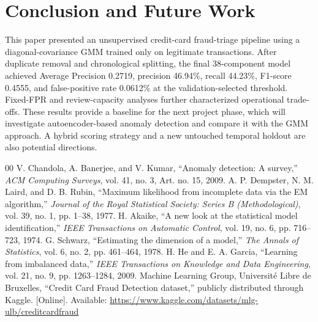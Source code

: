 \documentclass[conference]{IEEEtran}
\begin{document}
\section{Conclusion and Future Work}
This paper presented an unsupervised credit-card fraud-triage pipeline using a diagonal-covariance GMM trained only on legitimate transactions. After duplicate removal and chronological splitting, the final 38-component model achieved Average Precision 0.2719, precision 46.94\%, recall 44.23\%, F1-score 0.4555, and false-positive rate 0.0612\% at the validation-selected threshold. Fixed-FPR and review-capacity analyses further characterized operational trade-offs. These results provide a baseline for the next project phase, which will investigate autoencoder-based anomaly detection and compare it with the GMM approach. A hybrid scoring strategy and a new untouched temporal holdout are also potential directions.

\balance
\begin{thebibliography}{00}
 V. Chandola, A. Banerjee, and V. Kumar, ``Anomaly detection: A survey,'' \emph{ACM Computing Surveys}, vol. 41, no. 3, Art. no. 15, 2009.
 A. P. Dempster, N. M. Laird, and D. B. Rubin, ``Maximum likelihood from incomplete data via the EM algorithm,'' \emph{Journal of the Royal Statistical Society: Series B (Methodological)}, vol. 39, no. 1, pp. 1--38, 1977.
 H. Akaike, ``A new look at the statistical model identification,'' \emph{IEEE Transactions on Automatic Control}, vol. 19, no. 6, pp. 716--723, 1974.
 G. Schwarz, ``Estimating the dimension of a model,'' \emph{The Annals of Statistics}, vol. 6, no. 2, pp. 461--464, 1978.
 H. He and E. A. Garcia, ``Learning from imbalanced data,'' \emph{IEEE Transactions on Knowledge and Data Engineering}, vol. 21, no. 9, pp. 1263--1284, 2009.
 Machine Learning Group, Universit\'e Libre de Bruxelles, ``Credit Card Fraud Detection dataset,'' publicly distributed through Kaggle. [Online]. Available: \url{https://www.kaggle.com/datasets/mlg-ulb/creditcardfraud}
\end{thebibliography}
\end{document}
